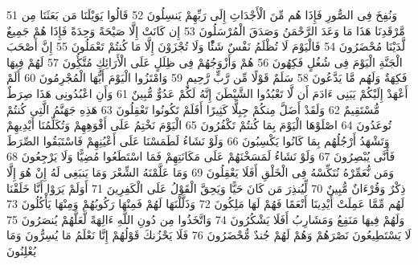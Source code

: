 \documentclass[20pt,a4paper]{article}
\begin{document}
{\tiny\colorbox{cl_aya}{51}} وَنُفِخَ فِى الصُّورِ فَإِذَا هُم مِّنَ الْأَجْدَاثِ إِلَى رَبِّهِمْ يَنسِلُونَ
{\tiny\colorbox{cl_aya}{52}} قَالُوا يَوَيْلَنَا مَن بَعَثَنَا مِن مَّرْقَدِنَا هَذَا مَا وَعَدَ الرَّحْمَنُ وَصَدَقَ الْمُرْسَلُونَ
{\tiny\colorbox{cl_aya}{53}} إِن كَانَتْ إِلَّا صَيْحَةً وَحِدَةً فَإِذَا هُمْ جَمِيعٌ لَّدَيْنَا مُحْضَرُونَ
{\tiny\colorbox{cl_aya}{54}} فَالْيَوْمَ لَا تُظْلَمُ نَفْسٌ شَئًْا وَلَا تُجْزَوْنَ إِلَّا مَا كُنتُمْ تَعْمَلُونَ
{\tiny\colorbox{cl_aya}{55}} إِنَّ أَصْحَبَ الْجَنَّةِ الْيَوْمَ فِى شُغُلٍ فَكِهُونَ
{\tiny\colorbox{cl_aya}{56}} هُمْ وَأَزْوَجُهُمْ فِى ظِلَلٍ عَلَى الْأَرَائِكِ مُتَّكُِٔونَ
{\tiny\colorbox{cl_aya}{57}} لَهُمْ فِيهَا فَكِهَةٌ وَلَهُم مَّا يَدَّعُونَ
{\tiny\colorbox{cl_aya}{58}} سَلَمٌ قَوْلًا مِّن رَّبٍّ رَّحِيمٍ
{\tiny\colorbox{cl_aya}{59}} وَامْتَزُوا الْيَوْمَ أَيُّهَا الْمُجْرِمُونَ
{\tiny\colorbox{cl_aya}{60}} أَلَمْ أَعْهَدْ إِلَيْكُمْ يَبَنِى ءَادَمَ أَن لَّا تَعْبُدُوا الشَّيْطَنَ إِنَّهُ لَكُمْ عَدُوٌّ مُّبِينٌ
{\tiny\colorbox{cl_aya}{61}} وَأَنِ اعْبُدُونِى هَذَا صِرَطٌ مُّسْتَقِيمٌ
{\tiny\colorbox{cl_aya}{62}} وَلَقَدْ أَضَلَّ مِنكُمْ جِبِلًّا كَثِيرًا أَفَلَمْ تَكُونُوا تَعْقِلُونَ
{\tiny\colorbox{cl_aya}{63}} هَذِهِ جَهَنَّمُ الَّتِى كُنتُمْ تُوعَدُونَ
{\tiny\colorbox{cl_aya}{64}} اصْلَوْهَا الْيَوْمَ بِمَا كُنتُمْ تَكْفُرُونَ
{\tiny\colorbox{cl_aya}{65}} الْيَوْمَ نَخْتِمُ عَلَى أَفْوَهِهِمْ وَتُكَلِّمُنَا أَيْدِيهِمْ وَتَشْهَدُ أَرْجُلُهُم بِمَا كَانُوا يَكْسِبُونَ
{\tiny\colorbox{cl_aya}{66}} وَلَوْ نَشَاءُ لَطَمَسْنَا عَلَى أَعْيُنِهِمْ فَاسْتَبَقُوا الصِّرَطَ فَأَنَّى يُبْصِرُونَ
{\tiny\colorbox{cl_aya}{67}} وَلَوْ نَشَاءُ لَمَسَخْنَهُمْ عَلَى مَكَانَتِهِمْ فَمَا اسْتَطَعُوا مُضِيًّا وَلَا يَرْجِعُونَ
{\tiny\colorbox{cl_aya}{68}} وَمَن نُّعَمِّرْهُ نُنَكِّسْهُ فِى الْخَلْقِ أَفَلَا يَعْقِلُونَ
{\tiny\colorbox{cl_aya}{69}} وَمَا عَلَّمْنَهُ الشِّعْرَ وَمَا يَنبَغِى لَهُ إِنْ هُوَ إِلَّا ذِكْرٌ وَقُرْءَانٌ مُّبِينٌ
{\tiny\colorbox{cl_aya}{70}} لِّيُنذِرَ مَن كَانَ حَيًّا وَيَحِقَّ الْقَوْلُ عَلَى الْكَفِرِينَ
{\tiny\colorbox{cl_aya}{71}} أَوَلَمْ يَرَوْا أَنَّا خَلَقْنَا لَهُم مِّمَّا عَمِلَتْ أَيْدِينَا أَنْعَمًا فَهُمْ لَهَا مَلِكُونَ
{\tiny\colorbox{cl_aya}{72}} وَذَلَّلْنَهَا لَهُمْ فَمِنْهَا رَكُوبُهُمْ وَمِنْهَا يَأْكُلُونَ
{\tiny\colorbox{cl_aya}{73}} وَلَهُمْ فِيهَا مَنَفِعُ وَمَشَارِبُ أَفَلَا يَشْكُرُونَ
{\tiny\colorbox{cl_aya}{74}} وَاتَّخَذُوا مِن دُونِ اللَّهِ ءَالِهَةً لَّعَلَّهُمْ يُنصَرُونَ
{\tiny\colorbox{cl_aya}{75}} لَا يَسْتَطِيعُونَ نَصْرَهُمْ وَهُمْ لَهُمْ جُندٌ مُّحْضَرُونَ
{\tiny\colorbox{cl_aya}{76}} فَلَا يَحْزُنكَ قَوْلُهُمْ إِنَّا نَعْلَمُ مَا يُسِرُّونَ وَمَا يُعْلِنُونَ
\end{document}
